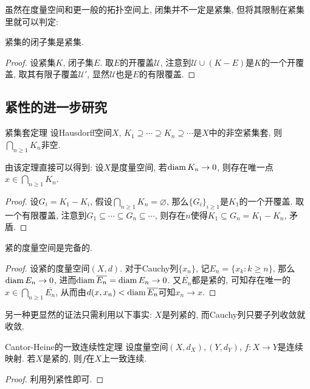 虽然在度量空间和更一般的拓扑空间上, 闭集并不一定是紧集, 但将其限制在紧集里就可以判定: 

\begin{proposition}{}
	紧集的闭子集是紧集. 
\end{proposition}
\begin{proof}
	设紧集$K$, 闭子集$E$. 取$E$的开覆盖$\mathcal{U}$, 注意到$\mathcal{U} \cup (K-E)$是$K$的一个开覆盖, 取其有限子覆盖$\mathcal{U}'$, 显然$\mathcal{U}$也是$E$的有限覆盖. 
\end{proof}

\subsection{紧性的进一步研究}

\begin{theorem}{紧集套定理}
	设Hausdorff空间$X$, $K_1 \supseteq \cdots \supseteq K_n \supseteq \cdots$是$X$中的非空紧集套, 则$\bigcap_{n\geq 1}K_n$非空. 
\end{theorem}
\begin{remark}
	由该定理直接可以得到: 设$X$是度量空间, 若$\operatorname{diam} K_n \to 0$, 则存在唯一点$x \in \bigcap_{n\geq 1}K_n$. 
\end{remark}
\begin{proof}
	设$G_i=K_1-K_i$, 假设$\bigcap_{n\geq 1}K_n = \varnothing$, 那么$\{ G_i \}_{i\geq 1}$是$K_1$的一个开覆盖. 取一个有限覆盖, 注意到$G_1 \subseteq \cdots \subseteq G_n \subseteq \cdots$, 则存在$n$使得$K_1 \subseteq G_n = K_1-K_n$, 矛盾. 
\end{proof}

\begin{corollary}{}
	紧的度量空间是完备的. 
\end{corollary}
\begin{proof}
	设紧的度量空间$(X,d)$. 对于Cauchy列$\{ x_n \}$, 记$E_n=\{ x_k:k \geq n \}$, 那么$\operatorname{diam} E_n \to 0$, 进而$\operatorname{diam} \overline{E_n} = \operatorname{diam} E_n \to 0$. 又$\overline{E_n}$都是紧的, 可知存在唯一的$x \in \bigcap_{n \geq 1} \overline{E_n}$, 从而由$d(x,x_n)<\operatorname{diam} \overline{E_n}$可知$x_n \to x$. 
\end{proof}
\begin{remark}
	另一种更显然的证法只需利用以下事实: $X$是列紧的, 而Cauchy列只要子列收敛就收敛. 
\end{remark}

\begin{theorem}{Cantor-Heine的一致连续性定理}
	设度量空间$(X,d_X),(Y,d_Y)$, $f:X \to Y$是连续映射. 若$X$是紧的, 则$f$在$X$上一致连续. 
\end{theorem}
\begin{proof}
	利用列紧性即可. 
\end{proof}

